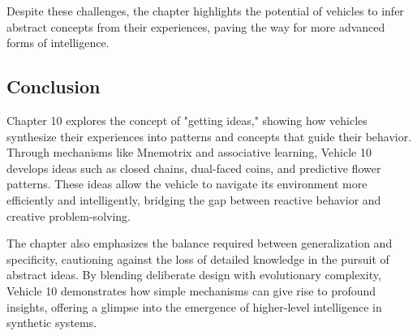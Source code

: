 \documentclass{article}
\begin{document}
	Despite these challenges, the chapter highlights the potential of vehicles to infer abstract concepts from their experiences, paving the way for more advanced forms of intelligence.

	\subsection*{Conclusion}

	Chapter 10 explores the concept of "getting ideas," showing how vehicles synthesize their experiences into patterns and concepts that guide their behavior. Through mechanisms like Mnemotrix and associative learning, Vehicle 10 develops ideas such as closed chains, dual-faced coins, and predictive flower patterns. These ideas allow the vehicle to navigate its environment more efficiently and intelligently, bridging the gap between reactive behavior and creative problem-solving.

	The chapter also emphasizes the balance required between generalization and specificity, cautioning against the loss of detailed knowledge in the pursuit of abstract ideas. By blending deliberate design with evolutionary complexity, Vehicle 10 demonstrates how simple mechanisms can give rise to profound insights, offering a glimpse into the emergence of higher-level intelligence in synthetic systems.
	
\end{document}
